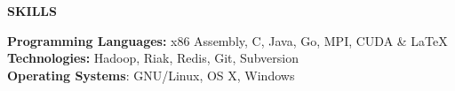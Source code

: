 \documentclass[10pt]{article}
\begin{document}


\MakeUppercase{\bf Skills}

{\bf Programming Languages:} x86 Assembly, C, Java, Go, MPI, CUDA \& \LaTeX\ \\
{\bf Technologies:} Hadoop, Riak, Redis, Git, Subversion\\
{\bf Operating Systems}: GNU/Linux, OS X, Windows\\
\end{document}
